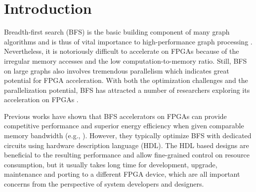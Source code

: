 \section{Introduction} \label{sec:intro}
Breadth-first search (BFS) is the basic building component of many graph algorithms 
and is thus of vital importance to high-performance graph processing 
\cite{attia2014cygraph, umuroglu2015hybrid}. Nevertheless, 
it is notoriously difficult to accelerate on FPGAs because of the 
irregular memory accesses and the low computation-to-memory ratio. 
Still, BFS on large graphs also involves tremendous 
parallelism which indicates great potential for FPGA acceleration. 
With both the optimization challenges and the parallelization potential, 
BFS has attracted a number of researchers exploring its acceleration on FPGAs 
\cite{attia2014cygraph, betkaoui2012reconfigurable, Dai2017foregraph, Ma2017fpga,
umuroglu2015hybrid, oguntebi2016graphops, engelhardt2016gravf, zhou2016high}. 

Previous works have shown that BFS accelerators on FPGAs can provide competitive  
performance and superior energy efficiency when given comparable memory bandwidth (e.g., \cite{Dai2017foregraph, Ma2017fpga,
umuroglu2015hybrid, oguntebi2016graphops}). 
However, they typically optimize BFS with dedicated circuits using hardware 
description language (HDL). The HDL based designs are beneficial to the 
resulting performance and allow fine-grained control on resource consumption, 
but it usually takes long time for development, upgrade, maintenance and 
porting to a different FPGA device, which are all important concerns 
from the perspective of system developers and designers. 


